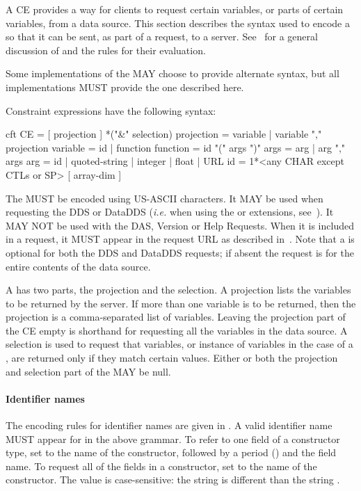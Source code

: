 \documentclass[justify]{nasa-ese}
\begin{document}
A \ac{CE} provides a way for clients to request certain variables, or parts
of certain variables, from a data source. This section describes the syntax
used to encode a \CE so that it can be sent, as part of a request, to a
server. See~ for a general discussion of \CEs and the rules for
their evaluation.

Some implementations of the \DAP MAY choose to provide alternate \CE
syntax, but all implementations MUST provide the one described here.

Constraint expressions have the following syntax:

\begin{vcode}{cft}
CE         = [ projection ] *("\&" selection) 
projection = variable | variable "," projection 
variable   = id | function 
function   = id "(" args ")" 
args       = arg | arg "," args 
arg        = id | quoted-string | integer | float | URL 
id         = 1*<any CHAR except CTLs or SP> [ array-dim ]
\end{vcode}

The \CE MUST be encoded using US-ASCII characters. It MAY be used when
requesting the DDS or DataDDS ({\it i.e.} when using the  or
 extensions, see~). It MAY NOT be used with
the DAS, Version or Help Requests. When it is included in a request, it MUST
appear in the request URL as described in~. Note
that a \CE is optional for both the DDS and DataDDS requests; if absent the
request is for the entire contents of the data source.

A \CE has two parts, the projection and the selection. A projection lists
the variables to be returned by the \DAP server. If more than one
variable is to be returned, then the projection is a comma-separated list of
variables. Leaving the projection part of the \ac{CE} empty is shorthand for
requesting all the variables in the data source. A selection is used to
request that variables, or instance of variables in the case of a \Sequence,
are returned only if they match certain values. Either or both the projection
and selection part of the \CE MAY be null.

\paragraph{Identifier names}
The encoding rules for identifier names are given in . A 
valid identifier name MUST appear for  in the above grammar. To
refer to one field of a constructor type, set  to the name of the
constructor, followed by a period () and the field name. To request
all of the fields in a constructor, set  to the name of the
constructor. The  value is case-sensitive: the string  is
different than the string .
\end{document}
